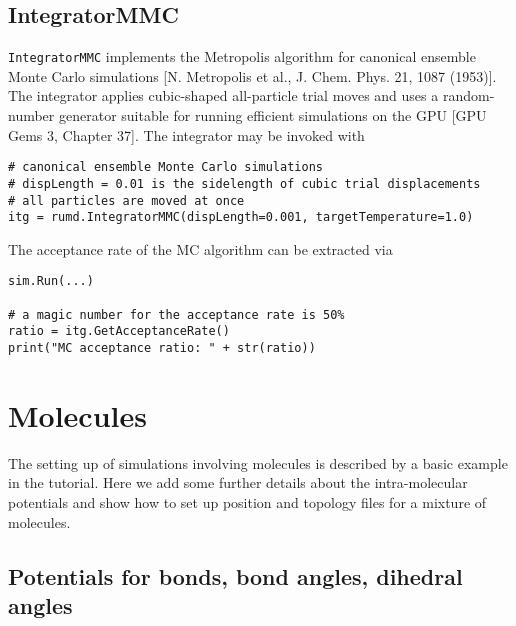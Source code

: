 \documentclass[a4paper]{article}
\begin{document}

\subsection{IntegratorMMC}
\verb|IntegratorMMC| implements the Metropolis algorithm for canonical ensemble Monte Carlo simulations [N. Metropolis et al., J. Chem. Phys. 21, 1087 (1953)]. 
The integrator applies cubic-shaped all-particle trial moves and uses a random-number generator suitable for running efficient simulations 
on the GPU [GPU Gems 3, Chapter 37]. The integrator may be invoked with

\begin{verbatim}
# canonical ensemble Monte Carlo simulations
# dispLength = 0.01 is the sidelength of cubic trial displacements
# all particles are moved at once
itg = rumd.IntegratorMMC(dispLength=0.001, targetTemperature=1.0)
\end{verbatim}
The acceptance rate of the  MC algorithm can be extracted via

\begin{verbatim}
sim.Run(...)

# a magic number for the acceptance rate is 50%
ratio = itg.GetAcceptanceRate() 
print("MC acceptance ratio: " + str(ratio))
\end{verbatim}

\section{Molecules\label{molecules}}

The setting up of simulations involving molecules is described by a basic example in the tutorial. 
Here we add some further details about the intra-molecular potentials and show how to set up position and topology files for a mixture of molecules.

\subsection{Potentials for bonds, bond angles, dihedral angles}
\end{document}
